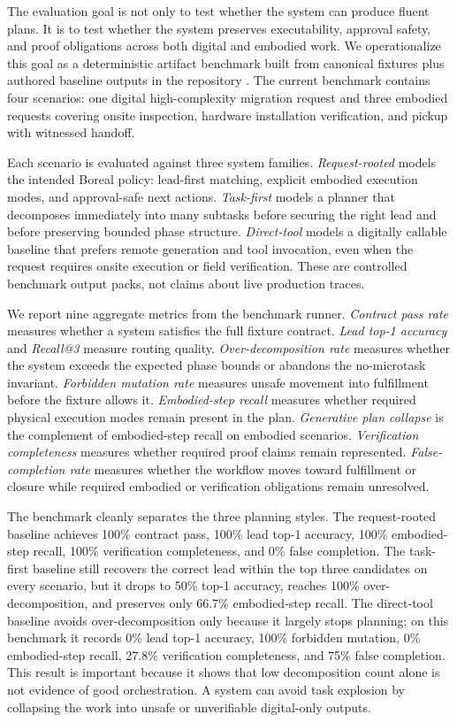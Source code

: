 The evaluation goal is not only to test whether the system can produce fluent plans. It is to test whether the system preserves executability, approval safety, and proof obligations across both digital and embodied work. We operationalize this goal as a deterministic artifact benchmark built from canonical fixtures plus authored baseline outputs in the repository \cite{boreal_request_processing_benchmark_2026,boreal_request_eval_fixtures_2026}. The current benchmark contains four scenarios: one digital high-complexity migration request and three embodied requests covering onsite inspection, hardware installation verification, and pickup with witnessed handoff.

Each scenario is evaluated against three system families. \emph{Request-rooted} models the intended Boreal policy: lead-first matching, explicit embodied execution modes, and approval-safe next actions. \emph{Task-first} models a planner that decomposes immediately into many subtasks before securing the right lead and before preserving bounded phase structure. \emph{Direct-tool} models a digitally callable baseline that prefers remote generation and tool invocation, even when the request requires onsite execution or field verification. These are controlled benchmark output packs, not claims about live production traces.

We report nine aggregate metrics from the benchmark runner. \emph{Contract pass rate} measures whether a system satisfies the full fixture contract. \emph{Lead top-1 accuracy} and \emph{Recall@3} measure routing quality. \emph{Over-decomposition rate} measures whether the system exceeds the expected phase bounds or abandons the no-microtask invariant. \emph{Forbidden mutation rate} measures unsafe movement into fulfillment before the fixture allows it. \emph{Embodied-step recall} measures whether required physical execution modes remain present in the plan. \emph{Generative plan collapse} is the complement of embodied-step recall on embodied scenarios. \emph{Verification completeness} measures whether required proof claims remain represented. \emph{False-completion rate} measures whether the workflow moves toward fulfillment or closure while required embodied or verification obligations remain unresolved.

The benchmark cleanly separates the three planning styles. The request-rooted baseline achieves 100\% contract pass, 100\% lead top-1 accuracy, 100\% embodied-step recall, 100\% verification completeness, and 0\% false completion. The task-first baseline still recovers the correct lead within the top three candidates on every scenario, but it drops to 50\% top-1 accuracy, reaches 100\% over-decomposition, and preserves only 66.7\% embodied-step recall. The direct-tool baseline avoids over-decomposition only because it largely stops planning; on this benchmark it records 0\% lead top-1 accuracy, 100\% forbidden mutation, 0\% embodied-step recall, 27.8\% verification completeness, and 75\% false completion. This result is important because it shows that low decomposition count alone is not evidence of good orchestration. A system can avoid task explosion by collapsing the work into unsafe or unverifiable digital-only outputs.

